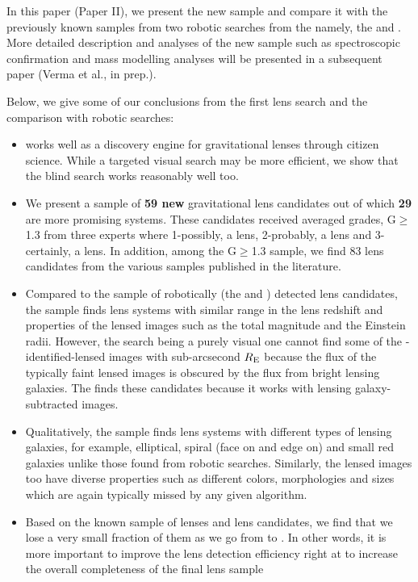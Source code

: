 \documentclass[useAMS,usenatbib,a4paper]{mn2e}
\begin{document}
In this paper (Paper II), we present the new \sw sample and compare it
with the previously known samples from two robotic searches from the
\cfhtls namely, the \rf and \af. More detailed description and analyses
of the new sample such as spectroscopic confirmation and mass modelling
analyses will be presented in a subsequent \sw paper (Verma et al., in
prep.).

Below, we give some of our conclusions from the first \sw lens search
and the comparison with robotic searches:
\begin{itemize}

\item \sw works well as a discovery engine for gravitational lenses
through citizen science. While a targeted visual search may be more
efficient, we show that the blind search works reasonably well too.

\item We present a sample of {\bf 59 new} gravitational lens candidates
out of which {\bf 29} are more promising systems. These candidates received
averaged grades, G$\ge$1.3 from three experts where 1-possibly, a lens,
2-probably, a lens and 3-certainly, a lens. In addition, among the
G$\ge$1.3 sample, we find 83 lens candidates from the various samples
published in the literature.

\item Compared to the sample of robotically (the \rf and \af) detected
lens candidates, the \sw sample finds lens systems with similar range in
the lens redshift and properties of the lensed images such as the total
magnitude and the Einstein radii. However, the \sw search being a purely
visual one cannot find some of the \rf-identified-lensed images with
sub-arcsecond $R_{\rm E}$ because the flux of the typically faint
lensed images is obscured by the flux from bright lensing galaxies. The
\rf finds these candidates because it works with lensing
galaxy-subtracted images.

\item Qualitatively, the \sw sample finds lens systems with different
types of lensing galaxies, for example, elliptical, spiral (face on and
edge on) and small red galaxies unlike those found from robotic
searches. Similarly, the lensed images too have diverse properties such
as different colors, morphologies and sizes which are again typically
missed by any given algorithm.

\item Based on the known sample of lenses and lens candidates, we find
that we lose a very small fraction of them as we go from \StageOne to
\StageTwo. In other words, it is more important to improve the lens
detection efficiency right at \StageOne to increase the overall
completeness of the final lens sample


\end{itemize}
\end{document}
